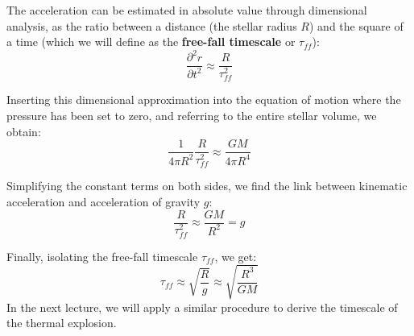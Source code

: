 The acceleration can be estimated in absolute value through dimensional analysis, as the ratio between a distance (the stellar radius $R$) and the square of a time (which we will define as the \textbf{free-fall timescale} or $\tau_{ff}$):
\begin{equation}
\frac{\partial^2 r}{\partial t^2} \approx \frac{R}{\tau_{ff}^2}
\end{equation}

Inserting this dimensional approximation into the equation of motion where the pressure has been set to zero, and referring to the entire stellar volume, we obtain:
\begin{equation}
\frac{1}{4\pi R^2} \frac{R}{\tau_{ff}^2} \approx \frac{G M}{4\pi R^4}
\end{equation}

Simplifying the constant terms on both sides, we find the link between kinematic acceleration and acceleration of gravity $g$:
\begin{equation}
\frac{R}{\tau_{ff}^2} \approx \frac{G M}{R^2} = g
\end{equation}

Finally, isolating the free-fall timescale $\tau_{ff}$, we get:
\begin{equation}
\tau_{ff} \approx \sqrt{\frac{R}{g}} \approx \sqrt{\frac{R^3}{G M}}
\end{equation}
In the next lecture, we will apply a similar procedure to derive the timescale of the thermal explosion.